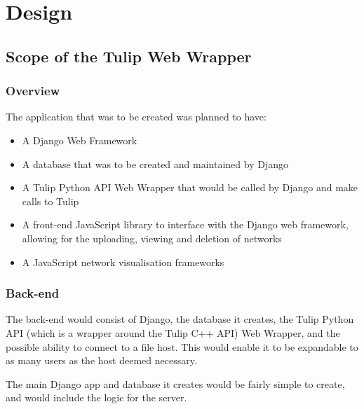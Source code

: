 \documentclass[../dissertation.tex]{subfiles}
\begin{document}
\chapter{Design}
\label{chap:design}

\section{Scope of the Tulip Web Wrapper}
\label{sec:scope}

\subsection{Overview}

The application that was to be created was planned to have:

\begin{itemize}
    \item A Django Web Framework
    \item A database that was to be created and maintained by Django
    \item A Tulip Python API Web Wrapper that would be called by Django and make calls to Tulip
    \item A front-end JavaScript library to interface with the Django web framework, allowing for the uploading, viewing and deletion of networks
    \item A JavaScript network visualisation frameworks
\end{itemize}

\subsection{Back-end}
\label{sec:overview-backend}

The back-end would consist of Django, the database it creates, the Tulip Python API (which is a wrapper around the Tulip C++ API) Web Wrapper, and the possible ability to connect to a file host. This would enable it to be expandable to as many users as the host deemed necessary.

The main Django app and database it creates would be fairly simple to create, and would include the logic for the server.
\end{document}
